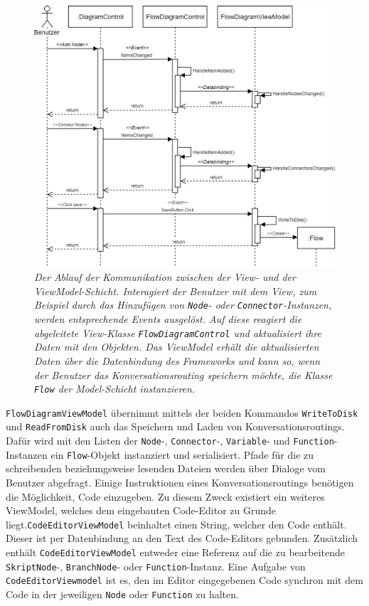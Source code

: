 \begin{figure} %
	\centering
		\includegraphics[width=\textwidth]{img/MVVMSequence.png}
	\caption[Kommunikationsablauf zwischen View- und ViewModel-Schicht]{\textit{Der Ablauf der Kommunikation zwischen der View- und der ViewModel-Schicht. Interagiert der Benutzer mit dem View, zum Beispiel durch das Hinzufügen von \texttt{Node}- oder \texttt{Connector}-Instanzen, werden entsprechende Events ausgelöst. Auf diese reagiert die abgeleitete View-Klasse \texttt{FlowDiagramControl} und aktualisiert ihre Daten mit den Objekten. Das ViewModel erhält die aktualisierten Daten über die Datenbindung des Frameworks und kann so, wenn der Benutzer das Konversationsrouting speichern möchte, die Klasse \texttt{Flow} der Model-Schicht instanzieren.}}
	\label{fig:UML:MVVMSequence}
\end{figure}
\texttt{FlowDiagramViewModel} übernimmt mittels der beiden Kommandos \texttt{Write\-To\-Disk} und \texttt{Read\-From\-Disk} auch das Speichern und Laden von Konversationsroutings. Dafür wird mit den Listen der \texttt{Node}-, \texttt{Connector}-, \texttt{Variable}- und \texttt{Function}-Instanzen ein \texttt{Flow}-Objekt instanziert und serialisiert. Pfade für die zu schreibenden beziehungsweise lesenden Dateien werden über Dialoge vom Benutzer abgefragt.
\newline
Einige Instruktionen eines Konversationsroutings benötigen die Möglichkeit, Code einzugeben. Zu diesem Zweck existiert ein weiteres ViewModel, welches dem eingebauten Code-Editor zu Grunde liegt.\texttt{CodeEditorViewModel} beinhaltet einen String, welcher den Code enthält. Dieser ist per Datenbindung an den Text des Code-Editors gebunden. Zusätzlich enthält \texttt{CodeEditorViewModel} entweder eine Referenz auf die zu bearbeitende \texttt{SkriptNode}-, \texttt{BranchNode}- oder \texttt{Function}-Instanz. Eine Aufgabe von \texttt{CodeEditorViewmodel} ist es, den im Editor eingegebenen Code synchron mit dem Code in der jeweiligen \texttt{Node} oder \texttt{Function} zu halten. 
